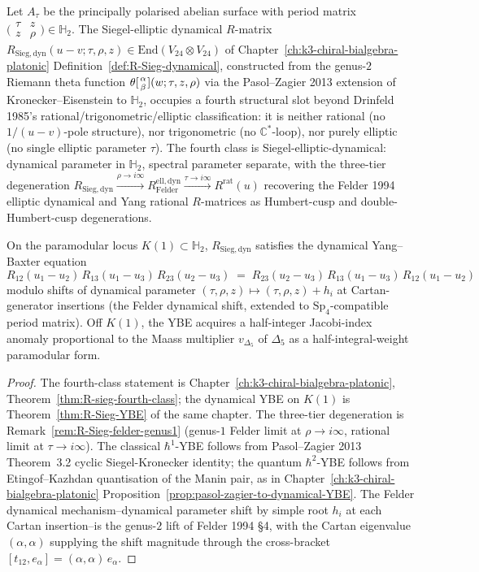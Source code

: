 \begin{theorem}
\label{thm:qca-R-Sieg-dynamical}
Let $A_\tau$ be the principally polarised abelian surface with period matrix
$\bigl(\begin{smallmatrix}\tau&z\\z&\rho\end{smallmatrix}\bigr)\in\mathbb{H}_2$.
The Siegel-elliptic dynamical $R$-matrix
$R_{\mathrm{Sieg,dyn}}(u-v;\tau,\rho,z)\in\mathrm{End}(V_{24}\otimes V_{24})$
of Chapter~\ref{ch:k3-chiral-bialgebra-platonic} Definition~\ref{def:R-Sieg-dynamical},
constructed from the genus-$2$ Riemann theta function
$\theta[{\alpha\atop\beta}](w;\tau,z,\rho)$ via the Pasol--Zagier 2013 extension of
Kronecker--Eisenstein to $\mathbb{H}_2$, occupies a fourth structural slot beyond
Drinfeld 1985's rational/trigonometric/elliptic classification: it is neither
rational (no $1/(u-v)$-pole structure), nor trigonometric (no $\mathbb{C}^*$-loop),
nor purely elliptic (no single elliptic parameter $\tau$). The fourth class is
Siegel-elliptic-dynamical: dynamical parameter in $\mathbb{H}_2$, spectral parameter
separate, with the three-tier degeneration
$R_{\mathrm{Sieg,dyn}}\xrightarrow{\rho\to i\infty} R^{\mathrm{ell,dyn}}_{\mathrm{Felder}}
\xrightarrow{\tau\to i\infty} R^{\mathrm{rat}}(u)$
recovering the Felder 1994 elliptic dynamical and Yang rational $R$-matrices as
Humbert-cusp and double-Humbert-cusp degenerations.

On the paramodular locus $K(1)\subset\mathbb{H}_2$,
$R_{\mathrm{Sieg,dyn}}$ satisfies the dynamical Yang--Baxter equation
\[
 R_{12}(u_1-u_2)\,R_{13}(u_1-u_3)\,R_{23}(u_2-u_3)
 \;=\;
 R_{23}(u_2-u_3)\,R_{13}(u_1-u_3)\,R_{12}(u_1-u_2)
\]
modulo shifts of dynamical parameter $(\tau,\rho,z)\mapsto(\tau,\rho,z)+h_i$
at Cartan-generator insertions (the Felder dynamical shift, extended to
$\mathrm{Sp}_4$-compatible period matrix). Off $K(1)$, the YBE acquires a
half-integer Jacobi-index anomaly proportional to the Maass multiplier
$v_{\Delta_5}$ of $\Delta_5$ as a half-integral-weight paramodular form.
\end{theorem}

\begin{proof}
The fourth-class statement is Chapter~\ref{ch:k3-chiral-bialgebra-platonic},
Theorem~\ref{thm:R-sieg-fourth-class}; the dynamical YBE on $K(1)$ is
Theorem~\ref{thm:R-Sieg-YBE} of the same chapter. The three-tier degeneration is
Remark~\ref{rem:R-Sieg-felder-genus1} (genus-$1$ Felder limit at $\rho\to i\infty$,
rational limit at $\tau\to i\infty$). The classical $\hbar^1$-YBE follows from
Pasol--Zagier 2013 Theorem~3.2 cyclic Siegel-Kronecker identity; the quantum
$\hbar^2$-YBE follows from Etingof--Kazhdan quantisation of the Manin pair, as
in Chapter~\ref{ch:k3-chiral-bialgebra-platonic}
Proposition~\ref{prop:pasol-zagier-to-dynamical-YBE}. The Felder dynamical
mechanism--dynamical parameter shift by simple root $h_i$ at each Cartan
insertion--is the genus-$2$ lift of Felder 1994 \S 4, with the Cartan eigenvalue
$(\alpha,\alpha)$ supplying the shift magnitude through the cross-bracket
$[t_{12},e_\alpha]=(\alpha,\alpha)\,e_\alpha$.
\end{proof}

